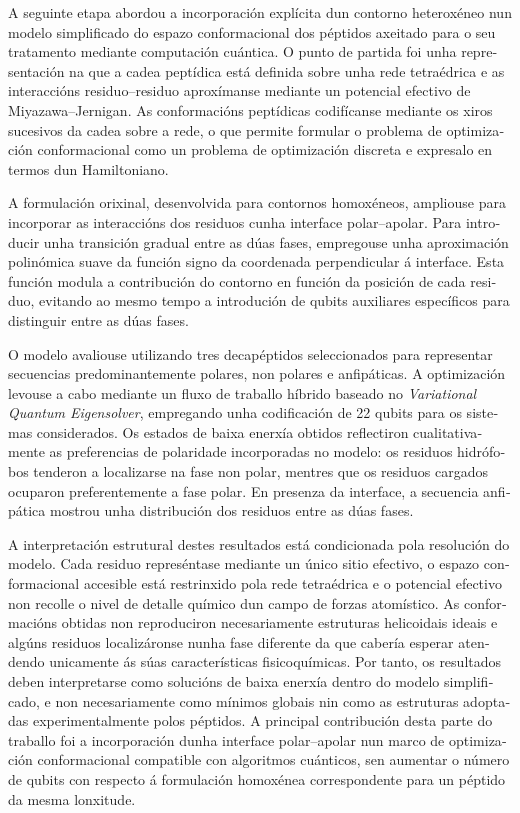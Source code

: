 \begin{otherlanguage}{galician}
A seguinte etapa abordou a incorporación explícita dun contorno heteroxéneo nun modelo simplificado do espazo conformacional dos péptidos axeitado para o seu tratamento mediante computación cuántica. O punto de partida foi unha representación na que a cadea peptídica está definida sobre unha rede tetraédrica e as interaccións residuo–residuo aproxímanse mediante un potencial efectivo de Miyazawa–Jernigan. As conformacións peptídicas codifícanse mediante os xiros sucesivos da cadea sobre a rede, o que permite formular o problema de optimización conformacional como un problema de optimización discreta e expresalo en termos dun Hamiltoniano.

A formulación orixinal, desenvolvida para contornos homoxéneos, ampliouse para incorporar as interaccións dos residuos cunha interface polar–apolar. Para introducir unha transición gradual entre as dúas fases, empregouse unha aproximación polinómica suave da función signo da coordenada perpendicular á interface. Esta función modula a contribución do contorno en función da posición de cada residuo, evitando ao mesmo tempo a introdución de qubits auxiliares específicos para distinguir entre as dúas fases.

O modelo avaliouse utilizando tres decapéptidos seleccionados para representar secuencias predominantemente polares, non polares e anfipáticas. A optimización levouse a cabo mediante un fluxo de traballo híbrido baseado no \textit{Variational Quantum Eigensolver}, empregando unha codificación de 22 qubits para os sistemas considerados. Os estados de baixa enerxía obtidos reflectiron cualitativamente as preferencias de polaridade incorporadas no modelo: os residuos hidrófobos tenderon a localizarse na fase non polar, mentres que os residuos cargados ocuparon preferentemente a fase polar. En presenza da interface, a secuencia anfipática mostrou unha distribución dos residuos entre as dúas fases.

A interpretación estrutural destes resultados está condicionada pola resolución do modelo. Cada residuo represéntase mediante un único sitio efectivo, o espazo conformacional accesible está restrinxido pola rede tetraédrica e o potencial efectivo non recolle o nivel de detalle químico dun campo de forzas atomístico. As conformacións obtidas non reproduciron necesariamente estruturas helicoidais ideais e algúns residuos localizáronse nunha fase diferente da que cabería esperar atendendo unicamente ás súas características fisicoquímicas. Por tanto, os resultados deben interpretarse como solucións de baixa enerxía dentro do modelo simplificado, e non necesariamente como mínimos globais nin como as estruturas adoptadas experimentalmente polos péptidos. A principal contribución desta parte do traballo foi a incorporación dunha interface polar–apolar nun marco de optimización conformacional compatible con algoritmos cuánticos, sen aumentar o número de qubits con respecto á formulación homoxénea correspondente para un péptido da mesma lonxitude.


\end{otherlanguage}
